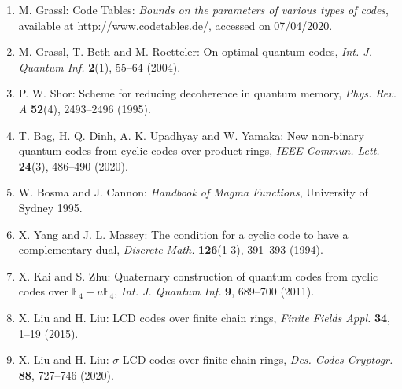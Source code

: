 \documentclass[12pt]{article}
\begin{document}
\begin{enumerate}
\item M. Grassl: Code Tables: \textit{Bounds on the parameters of various types of codes}, available at \url{http://www.codetables.de/}, accessed on 07/04/2020.
\item M. Grassl, T. Beth and M. Roetteler: On optimal quantum codes, \textit{Int. J. Quantum Inf.} \textbf{2}(1), 55--64 (2004).
\item P. W. Shor: Scheme for reducing decoherence in quantum memory, \textit{Phys. Rev. A} \textbf{52}(4), 2493--2496 (1995).
\item T. Bag, H. Q. Dinh, A. K. Upadhyay and W. Yamaka: New non-binary quantum codes from cyclic codes over product rings, \textit{IEEE Commun. Lett.} \textbf{24}(3), 486--490 (2020).
\item W. Bosma and J. Cannon: \textit{Handbook of Magma Functions}, University of Sydney 1995.
\item X. Yang and J. L. Massey: The condition for a cyclic code to have a complementary dual, \textit{Discrete Math.} \textbf{126}(1-3), 391--393 (1994).
\item X. Kai and S. Zhu: Quaternary construction of quantum codes from cyclic codes over $\mathbb{F}_4 + u\mathbb{F}_4$, \textit{Int. J. Quantum Inf.} \textbf{9}, 689--700 (2011).
\item X. Liu and H. Liu: LCD codes over finite chain rings, \textit{Finite Fields Appl.} \textbf{34}, 1--19 (2015).
\item X. Liu and H. Liu: $\sigma$-LCD codes over finite chain rings, \textit{Des. Codes Cryptogr.} \textbf{88}, 727--746 (2020).
\end{enumerate}
\end{document}
